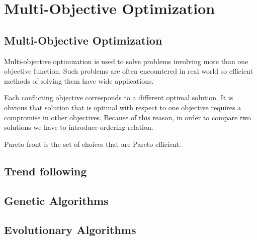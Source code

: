 \chapter{Multi-Objective Optimization}
\label{cha:multiObjectiveOptimization}




\section{Multi-Objective Optimization}
\label{sec:strukturaDokumentu}

Multi-objective optimization is used to solve problems involving more than one objective function.
Such problems are often encountered in real world so efficient methods of solving them have wide applications.


Each conflicting objective corresponds to a different optimal solution.  
It is obvious that solution that is optimal with respect to one objective requires a compromise in other objectives.
Because of this reason, in order to compare two solutions we have to introduce ordering relation.

Pareto front is the set of choices that are Pareto efficient. 


\section{Trend following}
\label{sec:trendFollowing}


\section{Genetic Algorithms}
\label{sec:genAlgorithms}


\section{Evolutionary Algorithms}
\label{sec:evolAlgorithms}


